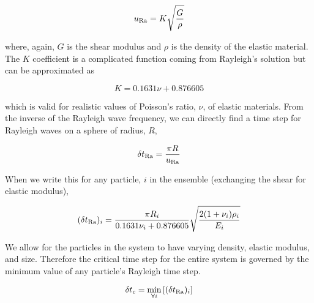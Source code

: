 \begin{equation}
	u_{\mathrm{Ra}} = K\sqrt{\frac{G}{\rho}}
\end{equation}

where, again, $G$ is the shear modulus and $\rho$ is the density of the elastic material. The $K$ coefficient is a complicated function coming from Rayleigh's solution but can be approximated as\cite{Sheng2004}

\begin{equation}
	K = 0.1631 \nu + 0.876605
\end{equation}

which is valid for realistic values of Poisson's ratio, $\nu$, of elastic materials. From the inverse of the Rayleigh wave frequency, we can directly find a time step for Rayleigh waves on a sphere of radius, $R$,

\begin{equation}\label{eq:rayleigh-stability-time}
	\delta t_{\mathrm{Ra}} = \frac{\pi R}{u_{\mathrm{Ra}}}
\end{equation}

When we write this for any particle, $i$ in the ensemble (exchanging the shear for elastic modulus),

\begin{equation}\label{eq:rayleigh-time step}
	(\delta t_{\mathrm{Ra}})_i = \frac{\pi R_i }{0.1631 \nu_i + 0.876605} \sqrt{\frac{2(1+\nu_i)\rho_i}{E_i}}
\end{equation}

We allow for the particles in the system to have varying density, elastic modulus, and size. Therefore the critical time step for the entire system is governed by the minimum value of any particle's Rayleigh time step. 

\begin{equation}
	\delta t_c = \min_{\forall i}\left[(\delta t_{\mathrm{Ra}})_i\right]
\end{equation}




